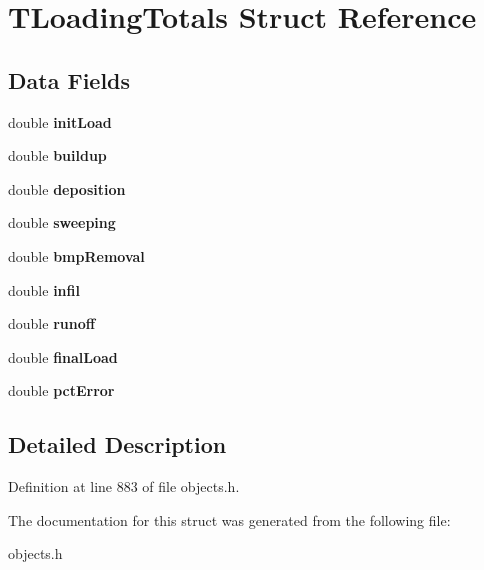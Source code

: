 \hypertarget{struct_t_loading_totals}{}\section{T\+Loading\+Totals Struct Reference}
\label{struct_t_loading_totals}
\subsection*{Data Fields}
\begin{DoxyCompactItemize}
\item 
\mbox{\label{struct_t_loading_totals_a58a23069449154c455581c1e542dca65}} 
double {\bfseries init\+Load}
\item 
\mbox{\label{struct_t_loading_totals_a6a407bd509d4bd526c9d7a92b79b6bde}} 
double {\bfseries buildup}
\item 
\mbox{\label{struct_t_loading_totals_a005dcfbb91ea67771c53935068085e9d}} 
double {\bfseries deposition}
\item 
\mbox{\label{struct_t_loading_totals_a78a56f8c076ce1baea4ab0a351fa8ff3}} 
double {\bfseries sweeping}
\item 
\mbox{\label{struct_t_loading_totals_ad4466f6ec1c26959093a8bf3e84ccdb7}} 
double {\bfseries bmp\+Removal}
\item 
\mbox{\label{struct_t_loading_totals_a870be47f33955d02d624bc9de06adad0}} 
double {\bfseries infil}
\item 
\mbox{\label{struct_t_loading_totals_a365dc60f2331a4280fc2be55b822191c}} 
double {\bfseries runoff}
\item 
\mbox{\label{struct_t_loading_totals_aff80a6e588aded8a200412632f53c31a}} 
double {\bfseries final\+Load}
\item 
\mbox{\label{struct_t_loading_totals_a6fcd79c6a0e66f48c596ff03935b6675}} 
double {\bfseries pct\+Error}
\end{DoxyCompactItemize}


\subsection{Detailed Description}


Definition at line 883 of file objects.\+h.



The documentation for this struct was generated from the following file\+:\begin{DoxyCompactItemize}
\item 
objects.\+h\end{DoxyCompactItemize}
